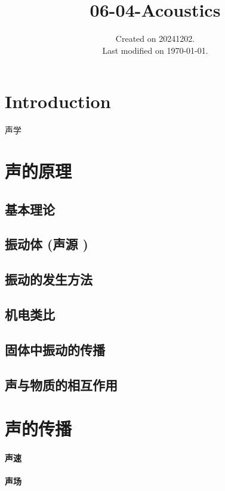 \documentclass[UTF8]{../06-Physics}
\begin{document}
\title{06-04-Acoustics}
\date{Created on 20241202.\\   Last modified on \today.}
\maketitle
\tableofcontents




\chapter{Introduction}
声学





\chapter{声的原理}
    \section{基本理论}
    \section{振动体 (声源 )}
    \section{振动的发生方法}
    \section{机电类比}
    \section{固体中振动的传播}
    \section{声与物质的相互作用}

\chapter{声的传播}
    \subsubsection{声速}
    \subsubsection{声场}
\end{document}
